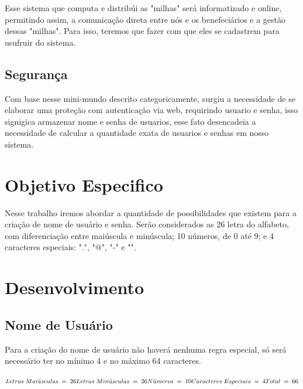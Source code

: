 \documentclass[]{article}
\begin{document}
Esse sistema que computa e distribúi as "milhas" será informatizado e online, permitindo assim, a comunicação direta entre nós e os benefeciários e a gestão dessas "milhas". Para isso, teremos que fazer com que eles se cadastrem para usufruir do sistema.

\subsection{Segurança}
Com base nesse mini-mundo descrito categoricamente, surgiu a necessidade de se elaborar uma proteção com autenticação via web, requirindo usuario e senha, isso signigica armazenar nome e senha de usuarios, esse fato desencadeia a necessidade de calcular a quantidade exata de usuarios e senhas em nosso sistema.
 
\section{Objetivo Especifico}
 Nesse trabalho iremos abordar a quantidade de possibilidades que existem para a criação de nome de usuário e senha. Serão considerados as 26 letra do alfabeto, com diferenciação entre maiúscula e minúscula; 10 números, de 0 até 9; e 4 caracteres especiais: ".", "@", "\--" e "\textunderscore".
 
 \section{Desenvolvimento}

 \subsection{Nome de Usuário}
 
 Para a criação do nome de usuário não haverá nenhuma regra especial, só será necessário ter no mínimo 4 e no máximo 64 caracteres.
 
 \begin{math}
 \\Letras\;Mai\acute{u}sculas\;=\;26
 \\Letras\;Min\acute{u}sculas\;=\;26
 \\N\acute{u}meros\;=\;10
 \\Caracteres\;Especiais\;=\;4
 \\Total\;=\;66
 \end{math}
 
\end{document}

